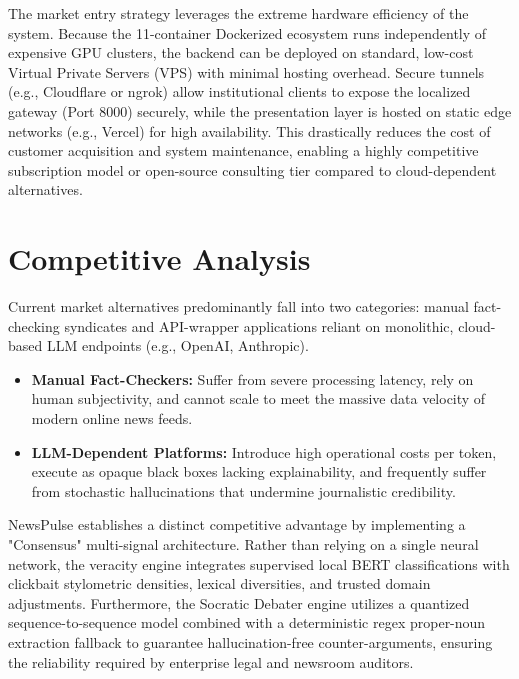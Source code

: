 The market entry strategy leverages the extreme hardware efficiency of the system. Because the 11-container Dockerized ecosystem runs independently of expensive GPU clusters, the backend can be deployed on standard, low-cost Virtual Private Servers (VPS) with minimal hosting overhead. Secure tunnels (e.g., Cloudflare or ngrok) allow institutional clients to expose the localized gateway (Port 8000) securely, while the presentation layer is hosted on static edge networks (e.g., Vercel) for high availability. This drastically reduces the cost of customer acquisition and system maintenance, enabling a highly competitive subscription model or open-source consulting tier compared to cloud-dependent alternatives.

\section{Competitive Analysis}
Current market alternatives predominantly fall into two categories: manual fact-checking syndicates and API-wrapper applications reliant on monolithic, cloud-based LLM endpoints (e.g., OpenAI, Anthropic).
\begin{itemize}
    \item \textbf{Manual Fact-Checkers:} Suffer from severe processing latency, rely on human subjectivity, and cannot scale to meet the massive data velocity of modern online news feeds.
    \item \textbf{LLM-Dependent Platforms:} Introduce high operational costs per token, execute as opaque black boxes lacking explainability, and frequently suffer from stochastic hallucinations that undermine journalistic credibility.
\end{itemize}
NewsPulse establishes a distinct competitive advantage by implementing a "Consensus" multi-signal architecture. Rather than relying on a single neural network, the veracity engine integrates supervised local BERT classifications with clickbait stylometric densities, lexical diversities, and trusted domain adjustments. Furthermore, the Socratic Debater engine utilizes a quantized sequence-to-sequence model combined with a deterministic regex proper-noun extraction fallback to guarantee hallucination-free counter-arguments, ensuring the reliability required by enterprise legal and newsroom auditors.

